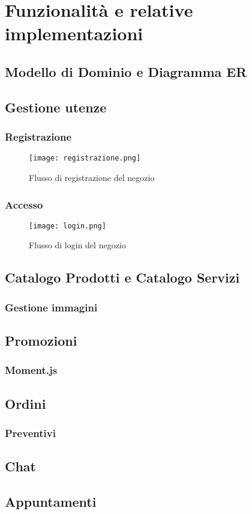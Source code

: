 \chapter{Funzionalità e relative implementazioni}
\section{Modello di Dominio e Diagramma ER}
\section{Gestione utenze}
\subsection{Registrazione}

\begin{figure}[!htb]
    \centering
    \texttt{[image: registrazione.png]}
    \caption{Flusso di registrazione del negozio}
\end{figure}
\subsection{Accesso}

\begin{figure}[!htb]
    \centering
    \texttt{[image: login.png]}
    \caption{Flusso di login del negozio}
\end{figure}
\section{Catalogo Prodotti e Catalogo Servizi}
\subsection{Gestione immagini}
\section{Promozioni}
\subsection{Moment.js}
\section{Ordini}
\subsection{Preventivi}
\section{Chat}
\section{Appuntamenti}